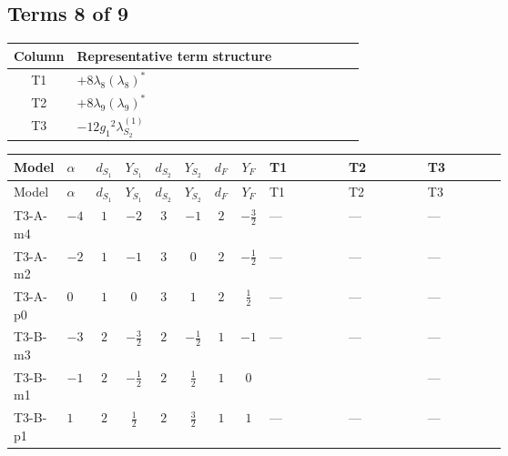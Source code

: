 \documentclass[8pt]{article}
\begin{document}
\begin{landscape}
\subsection*{Terms 8 of 9}
\begin{center}
\begin{tabular}{@{}c >{\raggedright\arraybackslash}p{0.82\linewidth}@{}}
\toprule
Column & Representative term structure \\
\midrule
T1 & \(\displaystyle +8 {\lambda_{8}} \left({\lambda_{8}}\right)^{*}\) \\
\midrule
T2 & \(\displaystyle +8 {\lambda_{9}} \left({\lambda_{9}}\right)^{*}\) \\
\midrule
T3 & \(\displaystyle -12 {g_1}^2 {\lambda_{S_2}^{(1)}}\) \\
\midrule
\bottomrule
\end{tabular}
\end{center}
\smallskip
\tiny
\begin{longtable}{@{}llcccccc >{\raggedright\arraybackslash}p{0.21\linewidth} >{\raggedright\arraybackslash}p{0.21\linewidth} >{\raggedright\arraybackslash}p{0.21\linewidth}@{}}
\toprule
Model & $\alpha$ & $d_{S_1}$ & $Y_{S_1}$ & $d_{S_2}$ & $Y_{S_2}$ & $d_F$ & $Y_F$ & T1 & T2 & T3 \\
\midrule
\endfirsthead
\toprule
Model & $\alpha$ & $d_{S_1}$ & $Y_{S_1}$ & $d_{S_2}$ & $Y_{S_2}$ & $d_F$ & $Y_F$ & T1 & T2 & T3 \\
\midrule
\endhead
T3-A-m4 & $-4$ & $1$ & $-2$ & $3$ & $-1$ & $2$ & $-\frac{3}{2}$ & --- & --- & --- \\
\midrule
T3-A-m2 & $-2$ & $1$ & $-1$ & $3$ & $0$ & $2$ & $-\frac{1}{2}$ & --- & --- & --- \\
\midrule
T3-A-p0 & $0$ & $1$ & $0$ & $3$ & $1$ & $2$ & $\frac{1}{2}$ & --- & --- & --- \\
\midrule
T3-B-m3 & $-3$ & $2$ & $-\frac{3}{2}$ & $2$ & $-\frac{1}{2}$ & $1$ & $-1$ & --- & --- & --- \\
\midrule
T3-B-m1 & $-1$ & $2$ & $-\frac{1}{2}$ & $2$ & $\frac{1}{2}$ & $1$ & $0$ & \scriptsize\adjustbox{max width=\linewidth}{$\begin{gathered} +8 {\lambda_{8}} \left({\lambda_{8}}\right)^{*}\end{gathered}$} & \scriptsize\adjustbox{max width=\linewidth}{$\begin{gathered} +8 {\lambda_{9}} \left({\lambda_{9}}\right)^{*}\end{gathered}$} & --- \\
\midrule
T3-B-p1 & $1$ & $2$ & $\frac{1}{2}$ & $2$ & $\frac{3}{2}$ & $1$ & $1$ & --- & --- & --- \\

\end{longtable}
\end{landscape}
\end{document}
